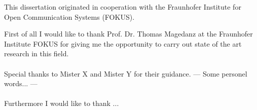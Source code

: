 \thispagestyle{empty}
\vspace*{3cm}

\noindent This dissertation originated in cooperation with the Fraunhofer Institute for Open Communication Systems (FOKUS).

\vspace*{1cm}
\noindent 
First of all I would like to thank Prof. Dr. Thomas Magedanz at the Fraunhofer Institute FOKUS for giving me the opportunity to carry out state of the art research in this field. 
\\
\\
Special thanks to Mister X and Mister Y for their guidance. --- Some personel words... ---
\\
\\
Furthermore I would like to thank ...